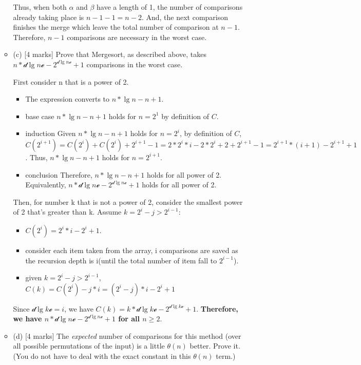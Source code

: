 \documentclass[12pt]{article}
\begin{document}
\begin{enumerate}
\begin{itemize}
Thus, when both $\alpha$ and $\beta$ have a length of 1, the number of comparisons already taking place is $n - 1 - 1 = n - 2$. And, the next comparison finishes the merge which leave the total number of comparison at $n - 1$. Therefore, $n - 1$ comparisons are necessary in the worst case.

\item{(c)} [4 marks]
Prove that Mergesort, as described above, takes $n * \mathcal{d} \lg{n} \mathcal{e} - 2^{\mathcal{d} \lg{n} \mathcal{e}} + 1$ comparisons in the worst case.

First consider n that is a power of 2.
\begin{itemize}
\item{} The expression converts to $n * \lg{n} - n + 1$.
\item{base case} $n * \lg{n} - n + 1$ holds for $n = 2^{1}$ by definition of $C$.
\item{induction} Given $n * \lg{n} - n + 1$ holds for $n = 2^{i}$, by definition of $C$, $C(2^{i+1}) = C(2^{i}) + C(2^{i}) + 2^{i+1} - 1 = 2 * 2^{i} * i - 2 * 2^{i} + 2 + 2^{i+1} - 1 = 2^{i+1} * (i+1) - 2^{i+1} + 1$. Thus, $n * \lg{n} - n + 1$ holds for $n = 2^{i+1}$.
\item{conclusion} Therefore, $n * \lg{n} - n + 1$ holds for all power of 2. Equivalently, $n * \mathcal{d} \lg{n} \mathcal{e} - 2^{\mathcal{d} \lg{n} \mathcal{e}} + 1$ holds for all power of 2.
\end{itemize}

Then, for number k that is not a power of 2, consider the smallest power of 2 that's greater than k. Assume $k = 2^{i} - j > 2^{i-1}$:
\begin{itemize}
\item{} $C(2^{i}) = 2^{i} * i - 2^{i} + 1$.
\item{} consider each item taken from the array, i comparisons are saved as the recursion depth is i(until the total number of item fall to $2^{i-1}$).
\item{} given $k = 2^{i} - j > 2^{i-1}$, $C(k) = C(2^{i}) - j * i = (2^{i} - j) * i - 2^{i} + 1$
\end{itemize}

Since $\mathcal{d} \lg{k} \mathcal{e} = i$, we have $C(k) = k * \mathcal{d} \lg{k} \mathcal{e} - 2^{\mathcal{d} \lg{k} \mathcal{e}} + 1$. \textbf{Therefore, we have $n * \mathcal{d} \lg{n} \mathcal{e} - 2^{\mathcal{d} \lg{n} \mathcal{e}} + 1$ for all $n \geq 2$}.
\item{(d)} [4 marks]
The \textit{expected} number of comparisons for this method (over all possible permutations of the input) is a little $\theta(n)$ better. Prove it. (You do not have to deal with the exact constant in this $\theta(n)$ term.)


\end{itemize}
\end{enumerate}
\end{document}
